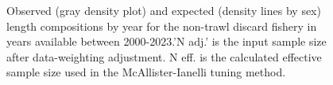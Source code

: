 \documentclass[
]{scrartcl}
\begin{document}
\begin{figure}[H]


\caption{\label{fig-len-fit-midt}Observed (gray density plot) and
expected (density lines by sex) length compositions by year for the
non-trawl discard fishery in years available between 2000-2023.'N adj.'
is the input sample size after data-weighting adjustment. N eff. is the
calculated effective sample size used in the McAllister-Ianelli tuning
method.}

\end{figure}%
\end{document}
